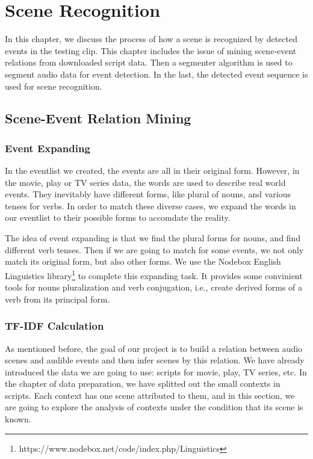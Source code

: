 \chapter{Scene Recognition}
In this chapter, we discuss the process of how a scene is recognized by detected events in the testing clip. 
This chapter includes the issue of mining scene-event relations from downloaded script data.
Then a segmenter algorithm is used to segment audio data for event detection. 
In the last, the detected event sequence is used for scene recognition. 

\section{Scene-Event Relation Mining}
\subsection{Event Expanding}
In the eventlist we created, the events are all in their original form. 
However, in the movie, play or TV series data, the words are used to describe real world events. 
They inevitably have different forms, like plural of nouns, and various tenses for verbs. 
In order to match these diverse cases, we expand the words in our eventlist to their possible forms to accomdate the reality. 

The idea of event expanding is that we find the plural forms for nouns, and find different verb tenses. 
Then if we are going to match for some events, we not only match its original form, but also other forms. 
We use the Nodebox English Linguistics library\footnote{https://www.nodebox.net/code/index.php/Linguistics} to complete this expanding task. 
It provides some convinient tools for nouns pluralization and verb conjugation, i.e., create derived forms of a verb from its principal form. 

\subsection{TF-IDF Calculation}
As mentioned before, the goal of our project is to build a relation between audio scenes and audible events and then infer scenes by this relation.  
We have already introduced the data we are going to use: scripts for movie, play, TV series, etc. 
In the chapter of data preparation, we have splitted out the small contexts in scripts. 
Each context has one scene attributed to them, and in this section, we are going to explore the analysis of contexts under the condition that its scene is known. 

